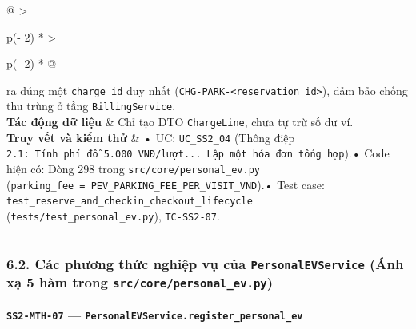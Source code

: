 \documentclass[11pt,a4paper]{article}
\begin{document}
\begin{longtable}[]{@{}
  >{\raggedright\arraybackslash}p{(\columnwidth - 2\tabcolsep) * }
  >{\raggedright\arraybackslash}p{(\columnwidth - 2\tabcolsep) * }@{}}
ra đúng một \texttt{charge\_id} duy nhất
(\texttt{CHG-PARK-\textless{}reservation\_id\textgreater{}}), đảm bảo
chống thu trùng ở tầng \texttt{BillingService}. \\
\textbf{Tác động dữ liệu} & Chỉ tạo DTO \texttt{ChargeLine}, chưa tự trừ
số dư ví. \\
\textbf{Truy vết và kiểm thử} & • UC: \texttt{UC\_SS2\_04} (Thông điệp
\texttt{2.1:\ Tính\ phí\ đỗ\ 5.000\ VNĐ/lượt...\ Lập\ một\ hóa\ đơn\ tổng\ hợp}).•
Code hiện có: Dòng 298 trong \texttt{src/core/personal\_ev.py}
(\texttt{parking\_fee\ =\ PEV\_PARKING\_FEE\_PER\_VISIT\_VND}).• Test
case: \texttt{test\_reserve\_and\_checkin\_checkout\_lifecycle}
(\texttt{tests/test\_personal\_ev.py}), \texttt{TC-SS2-07}. \\
\end{longtable}

\begin{center}\rule{0.5\linewidth}{0.5pt}\end{center}

\hypertarget{cuxe1c-phux1b0ux1a1ng-thux1ee9c-nghiux1ec7p-vux1ee5-cux1ee7a-personalevservice-uxe1nh-xux1ea1-5-huxe0m-trong-srccorepersonal_ev.py}{%
\subsubsection{\texorpdfstring{6.2. Các phương thức nghiệp vụ của
\texttt{PersonalEVService} (Ánh xạ 5 hàm trong
\texttt{src/core/personal\_ev.py})}{6.2. Các phương thức nghiệp vụ của PersonalEVService (Ánh xạ 5 hàm trong src/core/personal\_ev.py)}}\label{cuxe1c-phux1b0ux1a1ng-thux1ee9c-nghiux1ec7p-vux1ee5-cux1ee7a-personalevservice-uxe1nh-xux1ea1-5-huxe0m-trong-srccorepersonal_ev.py}}

\hypertarget{ss2-mth-07-personalevservice.register_personal_ev}{%
\paragraph{\texorpdfstring{\texttt{SS2-MTH-07} ---
\texttt{PersonalEVService.register\_personal\_ev}}{SS2-MTH-07 --- PersonalEVService.register\_personal\_ev}}\label{ss2-mth-07-personalevservice.register_personal_ev}}
\end{document}
